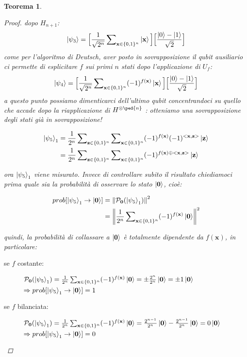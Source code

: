 \documentclass[12pt,a4paper,openright]{report}
\newcommand*\xor{\mathbin{\oplus}}
\newcommand{\norm}[1]{\left\lVert#1\right\rVert}
\newtheorem{mythm}{Teorema}[chapter]
\begin{document}
\begin{mythm}
\begin{proof}
dopo $H_{n+1}$:
\[
    \ket{\psi_3} = \Big[\frac{1}{\sqrt{2^n}}\sum\nolimits_{\textbf{x}\in{\{0,1\}^n}}\ket{\textbf{x}}\Big]\Big[\frac{\ket{0}-\ket{1}}{\sqrt2}\Big]
\]
come per l'algoritmo di Deutsch, aver posto in sovrapposizione il qubit ausiliario ci permette di esplicitare $f$ sui primi $n$ stati dopo l'applicazione di $U_f$:
\[
    \ket{\psi_4} = \Big[\frac{1}{\sqrt{2^n}}\sum\nolimits_{\textbf{x}\in{\{0,1\}^n}}(-1)^{f(\textbf{x})}\ket{\textbf{x}}\Big]\Big[\frac{\ket{0}-\ket{1}}{\sqrt2}\Big]
\]
a questo punto possiamo dimenticarci dell'ultimo qubit concentrandoci su quello che accade dopo la riapplicazione di $H^{\otimes\ped{n}}$ : otteniamo una sovrapposizione degli stati già in sovrapposizione!
\begin{center}
    \begin{align*}
        \ket{\psi_5}_1 &= \frac{1}{2^n}\sum\nolimits_{\textbf{z}\in{\{0,1\}^n}} \sum\nolimits_{\textbf{x}\in{\{0,1\}^n}}(-1)^{f(\textbf{x})}(-1)^{<\textbf{x},\textbf{z}>}\ket{\textbf{z}} \\
                       &= \frac{1}{2^n}\sum\nolimits_{\textbf{z}\in{\{0,1\}^n}} \sum\nolimits_{\textbf{x}\in{\{0,1\}^n}}(-1)^{f(\textbf{x}) \xor <\textbf{x},\textbf{z}>}\ket{\textbf{z}}
    \end{align*}
\end{center}
ora $\ket{\psi_5}_1$ viene misurato. Invece di controllare subito il risultato chiediamoci prima quale sia la probabilità di osservare lo stato $\ket{\textbf{0}}$, cioè:
\begin{center}
    \begin{align*}
        prob[\ket{\psi_5}_1 \rightarrow \ket{\textbf{0}}] &= \norm{\mathcal{P}_{\textbf{0}}(\ket{\psi_5}_1)}^2\\
                                                      &= \norm{\frac{1}{2^n}\sum\nolimits_{\textbf{x}\in{\{0,1\}^n}}(-1)^{f(\textbf{x})}\ket{\textbf{0}}}^2
    \end{align*}
\end{center}
quindi, la probabilità di collassare a $\ket{\textbf{0}}$ è totalmente dipendente da $f(\textbf{x})$, in particolare:
\begin{description}
    \item [se $f$ costante:] $\mathcal{P}_{\textbf{0}}(\ket{\psi_5}_1) = \frac{1}{2^n}\sum\nolimits_{\textbf{x}\in{\{0,1\}^n}}(-1)^{f(\textbf{x})}\ket{\textbf{0}} = \pm \frac{2^n}{2^n}\ket{\textbf{0}} = \pm 1\ket{\textbf{0}}$ \\
    $\Rightarrow prob[\ket{\psi_5}_1 \rightarrow \ket{\textbf{0}}] = 1$
    \item [se $f$ bilanciata:] $\mathcal{P}_{\textbf{0}}(\ket{\psi_5}_1) = \frac{1}{2^n}\sum\nolimits_{\textbf{x}\in{\{0,1\}^n}}(-1)^{f(\textbf{x})}\ket{\textbf{0}} =  \frac{2^{n-1}}{2^n}\ket{\textbf{0}} - \frac{2^{n-1}}{2^n}\ket{\textbf{0}} = 0\ket{\textbf{0}}$\\
    $\Rightarrow prob[\ket{\psi_5}_1 \rightarrow \ket{\textbf{0}}] = 0$
\end{description} 


\end{proof}
\end{mythm}
\end{document}
